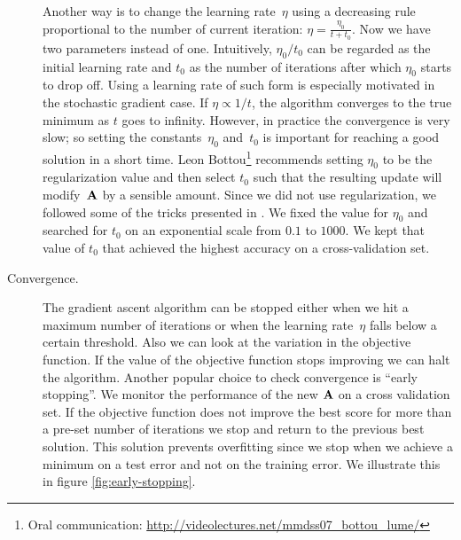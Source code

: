 \begin{description}
	Another way is to change the learning rate~$\eta$ using a decreasing rule proportional to the number of current iteration: $\eta=\frac{\eta_0}{t+t_0}$. Now we have two parameters instead of one. Intuitively, $\eta_0/t_0$ can be regarded as the initial learning rate and $t_0$ as the number of iterations after which $\eta_0$ starts to drop off. Using a learning rate of such form is especially motivated in the stochastic gradient case. If $\eta\propto 1/t$, the algorithm converges to the true minimum as $t$ goes to infinity. However, in practice the convergence is very slow; so setting the constants~$\eta_0$ and~$t_0$ is important for reaching a good solution in a short time. Leon Bottou\footnote{Oral communication: \url{http://videolectures.net/mmdss07_bottou_lume/}} recommends setting $\eta_0$ to be the regularization value and then select $t_0$ such that the resulting update will modify~$\mathbf{A}$ by a sensible amount. Since we did not use regularization, we followed some of the tricks presented in \citep{lecun1998}. We fixed the value for $\eta_0$ and searched for $t_0$ on an exponential scale from $0.1$ to $1000$. We kept that value of $t_0$ that achieved the highest accuracy on a cross-validation set.

	 \item[Convergence.] The gradient ascent algorithm can be stopped either when we hit a maximum number of iterations or when the learning rate~$\eta$ falls below a certain threshold. Also we can look at the variation in the objective function. If the value of the objective function stops improving we can halt the algorithm. Another popular choice to check convergence is ``early stopping''. We monitor the performance of the new $\mathbf{A}$ on a cross validation set. If the objective function does not improve the best score for more than a pre-set number of iterations we stop and return to the previous best solution. This solution prevents overfitting since we stop when we achieve a minimum on a test error and not on the training error. We illustrate this in figure \ref{fig:early-stopping}.
	\end{description}
	
